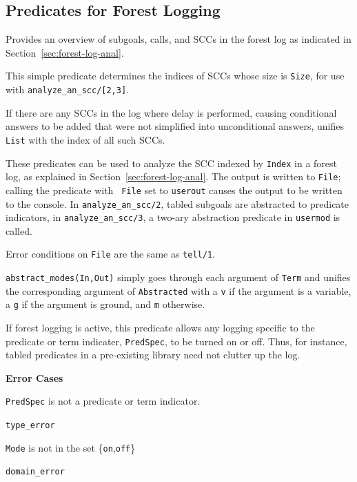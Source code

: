\subsection{Predicates for Forest Logging}

\begin{description}
%
Provides an overview of subgoals, calls, and SCCs in the forest log as
indicated in Section~\ref{sec:forest-log-anal}.

%
This simple predicate determines the indices of SCCs whose size is
{\tt Size}, for use with {\tt analyze\_an\_scc/[2,3]}.

%
If there are any SCCs in the log where delay is performed, causing
conditional answers to be added that were not simplified into
unconditional answers, unifies {\tt List} with the index of all such
SCCs.

%
These predicates can be used to analyze the SCC indexed by {\tt Index}
in a forest log, as explained in Section~\ref{sec:forest-log-anal}.
The output is written to {\tt File}; calling the predicate with {\tt
  File} set to {\tt userout} causes the output to be written to the
console.  In {\tt analyze\_an\_scc/2}, tabled subgoals are abstracted
to predicate indicators, in {\tt analyze\_an\_scc/3}, a two-ary
abstraction predicate in {\tt usermod} is called.

Error conditions on {\tt File} are the same as {\tt tell/1}.

%
{\tt abstract\_modes(In,Out)} simply goes through each argument of
{\tt Term} and unifies the corresponding argument of {\tt Abstracted}
with a {\tt v} if the argument is a variable, a {\tt g} if the
argument is ground, and {\tt m} otherwise.

If forest logging is active, this predicate allows any logging
specific to the predicate or term indicater, {\tt PredSpec}, to be
turned on or off.  Thus, for instance, tabled predicates in a
pre-existing library need not clutter up the log.

{\bf Error Cases}
\bi
\item 	{\tt PredSpec} is not a predicate or term indicator.
\bi
\item 	{\tt type\_error}
\ei
%
\item 	{\tt Mode} is not in the set \{{\tt on},{\tt off}\}
\bi
\item 	{\tt domain\_error}
\ei
\ei
\end{description}


